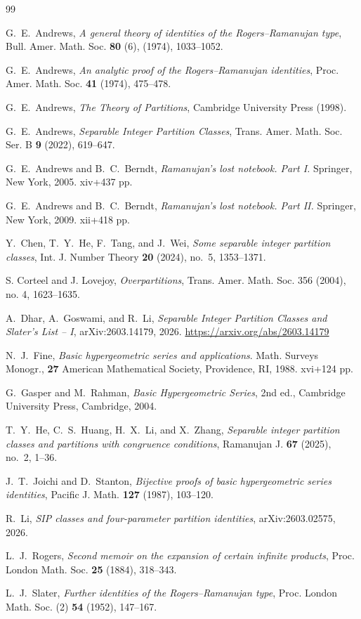 \documentclass[11pt]{amsart}
\theoremstyle{definition}
\theoremstyle{remark}
\numberwithin{equation}{section}
\begin{document}
\begin{thebibliography}{99}

G.~E.~Andrews,
\emph{A general theory of identities of the Rogers--Ramanujan type},
Bull. Amer. Math. Soc. \textbf{80} (6), (1974), 1033--1052.

G.~E.~Andrews,
\emph{An analytic proof of the Rogers--Ramanujan identities},
Proc. Amer. Math. Soc. \textbf{41} (1974), 475--478.

 G.~E.~Andrews, {\it The Theory of Partitions}, Cambridge University Press (1998).

 G.~E.~Andrews, {\it Separable Integer Partition Classes}, Trans. Amer. Math. Soc. Ser. B \textbf{9} (2022), 619--647.

 G.~E.~Andrews and B.~C.~Berndt, \textit{Ramanujan's lost notebook. Part I.} Springer, New York, 2005. xiv+437 pp.

 G.~E.~Andrews and B.~C.~Berndt, \textit{Ramanujan's lost notebook. Part II.} Springer, New York, 2009. xii+418 pp.

Y.~Chen, T.~Y.~He, F.~Tang, and J.~Wei,
\emph{Some separable integer partition classes},
Int. J. Number Theory \textbf{20} (2024), no.~5, 1353--1371.

S. Corteel and J. Lovejoy, \emph{Overpartitions}, Trans. Amer. Math. Soc. 356 (2004), no. 4, 1623–1635.

A.~Dhar, A.~Goswami, and R.~Li,
\emph{Separable Integer Partition Classes and Slater's List -- I},
arXiv:2603.14179, 2026. \url{https://arxiv.org/abs/2603.14179}

 N.~J.~Fine, \textit{Basic hypergeometric series and applications}. Math. Surveys Monogr., \textbf{27} American Mathematical Society, Providence, RI, 1988. xvi+124 pp.

G.~Gasper and M.~Rahman,
\emph{Basic Hypergeometric Series},
2nd ed., Cambridge University Press, Cambridge, 2004.

T.~Y.~He, C.~S.~Huang, H.~X.~Li, and X.~Zhang,
\emph{Separable integer partition classes and partitions with congruence conditions},
Ramanujan J. \textbf{67} (2025), no.~2, 1--36.

J.~T.~Joichi and D.~Stanton,
\emph{Bijective proofs of basic hypergeometric series identities},
Pacific J. Math. \textbf{127} (1987), 103--120.

R.~Li,
\emph{SIP classes and four-parameter partition identities}, arXiv:2603.02575, 2026.

 L.~J.~Rogers, \textit{Second memoir on the expansion of certain infinite products}, Proc. London Math. Soc. \textbf{25} (1884), 318--343.

L.~J.~Slater,
\emph{Further identities of the Rogers--Ramanujan type},
Proc. London Math. Soc. (2) \textbf{54} (1952), 147--167.
\end{thebibliography}
\end{document}
